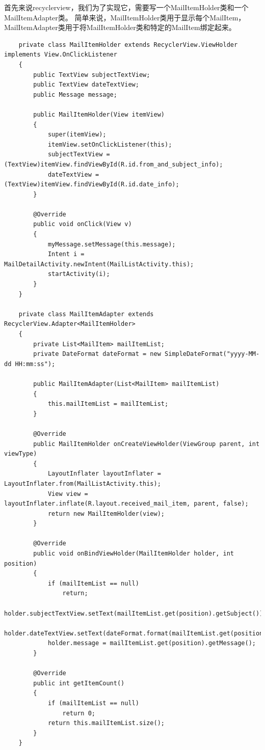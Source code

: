 \documentclass[a4paper,left=2.5cm,right=2.5cm,11pt]{article}
\begin{document}
	首先来说recyclerview，我们为了实现它，需要写一个MailItemHolder类和一个MailItemAdapter类。
	简单来说，MailItemHolder类用于显示每个MailItem，MailItemAdapter类用于将MailItemHolder类和特定的MailItem绑定起来。
	\begin{lstlisting}
	private class MailItemHolder extends RecyclerView.ViewHolder implements View.OnClickListener
    {
        public TextView subjectTextView;
        public TextView dateTextView;
        public Message message;

        public MailItemHolder(View itemView)
        {
            super(itemView);
            itemView.setOnClickListener(this);
            subjectTextView = (TextView)itemView.findViewById(R.id.from_and_subject_info);
            dateTextView = (TextView)itemView.findViewById(R.id.date_info);
        }

        @Override
        public void onClick(View v)
        {
            myMessage.setMessage(this.message);
            Intent i = MailDetailActivity.newIntent(MailListActivity.this);
            startActivity(i);
        }
    }

    private class MailItemAdapter extends RecyclerView.Adapter<MailItemHolder>
    {
        private List<MailItem> mailItemList;
        private DateFormat dateFormat = new SimpleDateFormat("yyyy-MM-dd HH:mm:ss");

        public MailItemAdapter(List<MailItem> mailItemList)
        {
            this.mailItemList = mailItemList;
        }

        @Override
        public MailItemHolder onCreateViewHolder(ViewGroup parent, int viewType)
        {
            LayoutInflater layoutInflater = LayoutInflater.from(MailListActivity.this);
            View view = layoutInflater.inflate(R.layout.received_mail_item, parent, false);
            return new MailItemHolder(view);
        }

        @Override
        public void onBindViewHolder(MailItemHolder holder, int position)
        {
            if (mailItemList == null)
                return;
            holder.subjectTextView.setText(mailItemList.get(position).getSubject());
            holder.dateTextView.setText(dateFormat.format(mailItemList.get(position).getDate()));
            holder.message = mailItemList.get(position).getMessage();
        }

        @Override
        public int getItemCount()
        {
            if (mailItemList == null)
                return 0;
            return this.mailItemList.size();
        }
    }
	\end{lstlisting}
\end{document}
